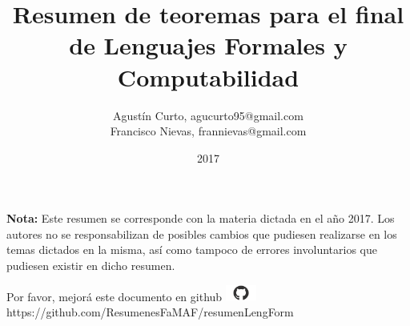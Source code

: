 \documentclass[12pt,a4paper]{article}
\author{Agustín Curto, agucurto95@gmail.com \\
			 Francisco Nievas, frannievas@gmail.com}
\title{Resumen de teoremas para el final \\ de Lenguajes Formales y Computabilidad}
\date{2017}
\newcommand{\PN}{\par\noindent}
\begin{document}
	\clearpage\maketitle
 	\thispagestyle{empty}
 	\tableofcontents

	\vspace{5cm}
	\PN \textbf{Nota:} Este resumen se corresponde con la materia dictada en el año 2017. Los autores no se
	responsabilizan de posibles cambios que pudiesen realizarse en los temas dictados en la misma, así como tampoco de
	errores involuntarios que pudiesen existir en dicho resumen.

	\vspace{\fill}
	\begin{center}
		Por favor, mejorá este documento en github
		\includegraphics[width=1cm]{graphics/github.png} \\
		https://github.com/ResumenesFaMAF/resumenLengForm
	\end{center}

	\pagebreak

	
	
	
	
	
	
\end{document}
